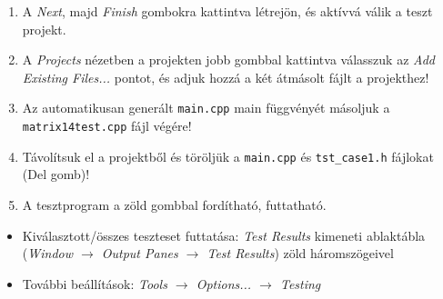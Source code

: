\begin{frame}
  \begin{enumerate}
    \setcounter{enumi}{\theqt}
    \item A \emph{Next}, majd \emph{Finish} gombokra kattintva létrejön, és aktívvá válik a teszt projekt.
    \item A \emph{Projects} nézetben a projekten jobb gombbal kattintva válasszuk az \emph{Add Existing Files...} pontot, és adjuk hozzá a két átmásolt fájlt a projekthez!
    \item Az automatikusan generált \texttt{main.cpp} main függvényét másoljuk a \texttt{matrix14test.cpp} fájl végére!
    \item Távolítsuk el a projektből és töröljük a \texttt{main.cpp} és \texttt{tst\_case1.h} fájlokat (Del gomb)!
    \item A tesztprogram a zöld gombbal fordítható, futtatható.
    \setcounter{qt}{\theenumi}
  \end{enumerate}
\end{frame}

\begin{frame}
  \begin{itemize}
    \item Kiválasztott/összes teszteset futtatása: \emph{Test Results} kimeneti ablaktábla (\emph{Window $\to$ Output Panes 
$\to$ Test Results}) zöld háromszögeivel\\
  \end{itemize}
\end{frame}

\begin{frame}
  \begin{itemize}
    \item További beállítások: \emph{Tools $\to$ Options... $\to$ Testing}\\
  \end{itemize}
\end{frame}
